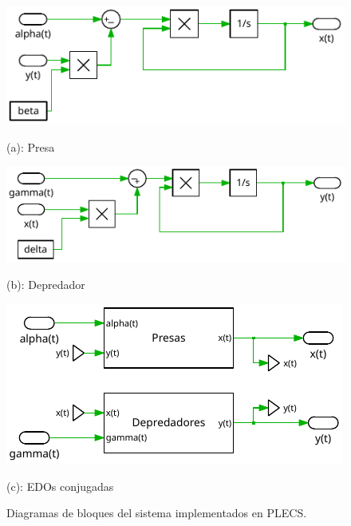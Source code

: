\begin{figure}
    \centering
    \begin{minipage}{0.42\linewidth}
        \centering
        \includegraphics[width=\linewidth]{figs/presa.pdf}
        \caption*{(a): Presa}
    \end{minipage}
    \begin{minipage}{0.42\linewidth}
        \centering
        \includegraphics[width=\linewidth]{figs/depred.pdf}
        \caption*{(b): Depredador}
    \end{minipage}
    \begin{minipage}{0.42\linewidth}
        \centering
        \includegraphics[width=\linewidth]{figs/tot.pdf}
        \caption*{(c): EDOs conjugadas}
    \end{minipage}
    \caption{Diagramas de bloques del sistema implementados en PLECS.}
    \label{fig2}
\end{figure}

